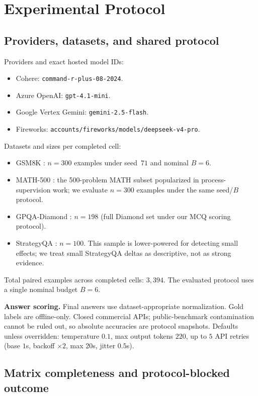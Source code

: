 \section{Experimental Protocol}
\label{sec:setup}

\subsection{Providers, datasets, and shared protocol}

Providers and exact hosted model IDs:
\begin{itemize}
\item Cohere: \texttt{command-r-plus-08-2024}.
\item Azure OpenAI: \texttt{gpt-4.1-mini}.
\item Google Vertex Gemini: \texttt{gemini-2.5-flash}.
\item Fireworks: \texttt{accounts/fireworks/models/deepseek-v4-pro}.
\end{itemize}

Datasets and sizes per completed cell:
\begin{itemize}
\item GSM8K \citep{gsm8k}: $n{=}300$ examples under seed~$71$ and nominal $B{=}6$.
\item MATH-500 \citep{math500,letsverify}: the 500-problem MATH subset popularized in process-supervision
work; we evaluate $n{=}300$ examples under the same seed/$B$ protocol.
\item GPQA-Diamond \citep{gpqa}: $n{=}198$ (full Diamond set under our MCQ scoring protocol).
\item StrategyQA \citep{strategyqa}: $n{=}100$. This sample is lower-powered for detecting small
effects; we treat small StrategyQA deltas as descriptive, not as strong evidence.
\end{itemize}
Total paired examples across completed cells: $3{,}394$. The evaluated protocol uses a single
nominal budget $B{=}6$.

\textbf{Answer scoring.} Final answers use dataset-appropriate normalization. Gold labels are
offline-only. Closed commercial APIs; public-benchmark contamination cannot be ruled out, so
absolute accuracies are protocol snapshots. Defaults unless overridden: temperature $0.1$, max output
tokens $220$, up to $5$ API retries (base $1$s, backoff $\times 2$, max $20$s, jitter $0.5$s).

\subsection{Matrix completeness and protocol-blocked outcome}


